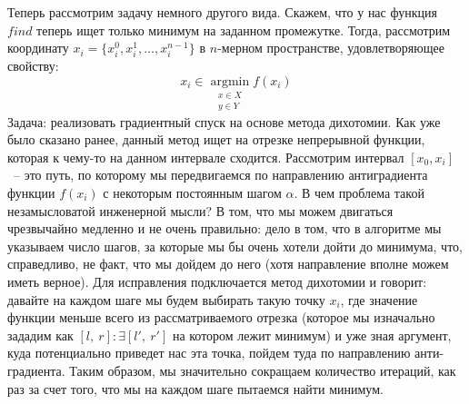 \documentclass[12pt, a4paper, oneside]{article}
\begin{document}
	Теперь рассмотрим задачу немного другого вида. Скажем, что у нас функция $find$ теперь ищет только минимум на заданном промежутке. Тогда, рассмотрим координату $x_{i} = \{x^{0}_{i}, x^{1}_{i}, \ldots, x^{n - 1}_{i}\}$ в $n$-мерном пространстве, удовлетворяющее свойству:
	\[
		x_{i} \in \operatorname*{argmin}_{\substack{x \in X \\ y \in Y}}{f(x_{i})}
	\]
	Задача: реализовать градиентный спуск на основе метода дихотомии. Как уже было сказано ранее, данный метод ищет на отрезке непрерывной функции, которая к чему-то на данном интервале сходится. Рассмотрим интервал $[x_{0}, x_{i}]$~-- это путь, по которому мы передвигаемся по направлению антиградиента функции $f(x_{i})$ с некоторым постоянным шагом $\alpha$. В чем проблема такой незамысловатой инженерной мысли? В том, что мы можем двигаться чрезвычайно медленно и не очень правильно: дело в том, что в алгоритме мы указываем число шагов, за которые мы бы очень хотели дойти до минимума, что, справедливо, не факт, что мы дойдем до него (хотя направление вполне можем иметь верное). Для исправления подключается метод дихотомии и говорит: давайте на каждом шаге мы будем выбирать такую точку $x_{i}$, где значение функции меньше всего из рассматриваемого отрезка (которое мы изначально зададим как $[l,~r] : \exists [l',~r']$ на котором лежит минимум) и уже зная аргумент, куда потенциально приведет нас эта точка, пойдем туда по направлению анти-градиента. Таким образом, мы значительно сокращаем количество итераций, как раз за счет того, что мы на каждом шаге пытаемся найти минимум.
\end{document}
